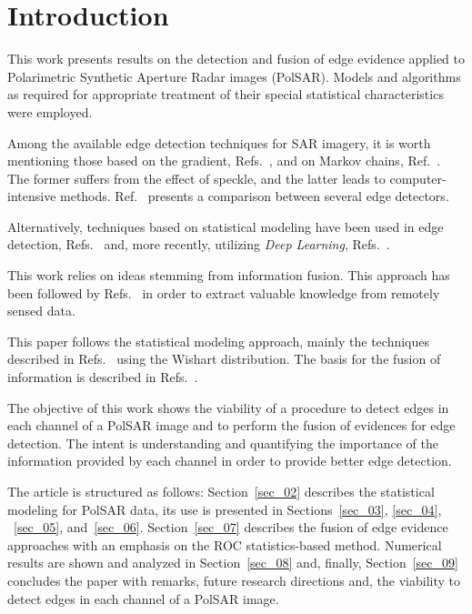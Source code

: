 \documentclass[conference]{IEEEtran}
\begin{document}
\section{Introduction}\label{sec_01}

This work presents results on the detection and fusion of edge evidence applied to Polarimetric Synthetic Aperture Radar images (PolSAR). Models and algorithms as required for appropriate treatment of their special statistical characteristics were employed.

Among the available edge detection techniques for SAR imagery, it is worth mentioning those based on the gradient, Refs.~\cite{tlb, obw, flmc, fyf}, and on Markov chains, Ref.~\cite{bf}. The former suffers from the effect of speckle, and the latter leads to computer-intensive methods. Ref.~\cite{gfn} presents a comparison between several edge detectors. 

Alternatively, techniques based on statistical modeling have been used in edge detection, Refs.~\cite{gmbf, fbgm, horrit, gfn} and, more recently,  utilizing \textit{Deep Learning}, Refs.~\cite{bac, ztmxzxf, tabmm, xstz}.

This work relies on ideas stemming from information fusion.
This approach has been followed by Refs.~\cite{sglmla,sg} in order to extract valuable knowledge from remotely sensed data.

This paper follows the statistical modeling approach, mainly the techniques described in Refs.~\cite{fbgm, nhfc} using the Wishart distribution.
The basis for the fusion of information is described in Refs.~\cite{mit, sg}. 

The objective of this work shows the viability of a procedure to detect edges in each channel of a PolSAR image and to perform the fusion of evidences for edge detection. The intent is understanding and quantifying the importance of the information provided by each channel in order to provide better edge detection.

The article is structured as follows: 
Section~\ref{sec_02} describes the statistical modeling for PolSAR data, 
its use is presented in Sections~\ref{sec_03}, \ref{sec_04}, ~\ref{sec_05}, and~\ref{sec_06}.
Section~\ref{sec_07} describes the fusion of edge evidence approaches with an emphasis on the ROC statistics-based method.
Numerical results are shown and analyzed in Section~\ref{sec_08} and, finally, Section~\ref{sec_09} concludes the paper with remarks, future research directions and, the viability to detect edges in each channel of a PolSAR image.
\end{document}
